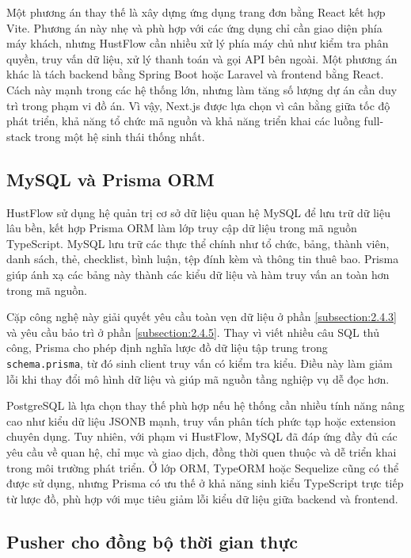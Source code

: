 \documentclass[../DoAn.tex]{subfiles}
\begin{document}
Một phương án thay thế là xây dựng ứng dụng trang đơn bằng React kết hợp Vite. Phương án này nhẹ và phù hợp với các ứng dụng chỉ cần giao diện phía máy khách, nhưng HustFlow cần nhiều xử lý phía máy chủ như kiểm tra phân quyền, truy vấn dữ liệu, xử lý thanh toán và gọi API bên ngoài. Một phương án khác là tách backend bằng Spring Boot hoặc Laravel và frontend bằng React. Cách này mạnh trong các hệ thống lớn, nhưng làm tăng số lượng dự án cần duy trì trong phạm vi đồ án. Vì vậy, Next.js được lựa chọn vì cân bằng giữa tốc độ phát triển, khả năng tổ chức mã nguồn và khả năng triển khai các luồng full-stack trong một hệ sinh thái thống nhất.

\subsection{MySQL và Prisma ORM}
\label{subsection:3.2.2}

HustFlow sử dụng hệ quản trị cơ sở dữ liệu quan hệ MySQL \cite{mysql} để lưu trữ dữ liệu lâu bền, kết hợp Prisma ORM \cite{prisma} làm lớp truy cập dữ liệu trong mã nguồn TypeScript. MySQL lưu trữ các thực thể chính như tổ chức, bảng, thành viên, danh sách, thẻ, checklist, bình luận, tệp đính kèm và thông tin thuê bao. Prisma giúp ánh xạ các bảng này thành các kiểu dữ liệu và hàm truy vấn an toàn hơn trong mã nguồn.

Cặp công nghệ này giải quyết yêu cầu toàn vẹn dữ liệu ở phần \ref{subsection:2.4.3} và yêu cầu bảo trì ở phần \ref{subsection:2.4.5}. Thay vì viết nhiều câu SQL thủ công, Prisma cho phép định nghĩa lược đồ dữ liệu tập trung trong \texttt{schema.prisma}, từ đó sinh client truy vấn có kiểm tra kiểu. Điều này làm giảm lỗi khi thay đổi mô hình dữ liệu và giúp mã nguồn tầng nghiệp vụ dễ đọc hơn.

PostgreSQL là lựa chọn thay thế phù hợp nếu hệ thống cần nhiều tính năng nâng cao như kiểu dữ liệu JSONB mạnh, truy vấn phân tích phức tạp hoặc extension chuyên dụng. Tuy nhiên, với phạm vi HustFlow, MySQL đã đáp ứng đầy đủ các yêu cầu về quan hệ, chỉ mục và giao dịch, đồng thời quen thuộc và dễ triển khai trong môi trường phát triển. Ở lớp ORM, TypeORM hoặc Sequelize cũng có thể được sử dụng, nhưng Prisma có ưu thế ở khả năng sinh kiểu TypeScript trực tiếp từ lược đồ, phù hợp với mục tiêu giảm lỗi kiểu dữ liệu giữa backend và frontend.

\subsection{Pusher cho đồng bộ thời gian thực}
\label{subsection:3.2.3}
\end{document}
